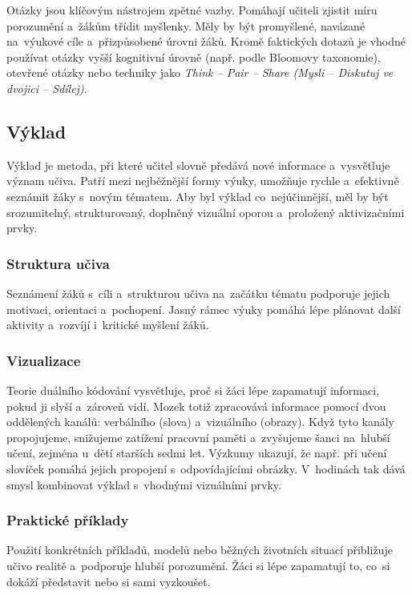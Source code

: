 \documentclass[male,czech,api_bc]{kitheses}
\begin{document}
Otázky jsou klíčovým nástrojem zpětné vazby. Pomáhají učiteli zjistit míru porozumění a~žákům třídit myšlenky. Měly by být promyšlené, navázané na~výukové cíle a~přizpůsobené úrovni žáků. Kromě faktických dotazů je vhodné používat otázky vyšší kognitivní úrovně (např. podle Bloomovy taxonomie), otevřené otázky nebo techniky jako \textit{Think -- Pair -- Share (Mysli -- Diskutuj ve dvojici -- Sdílej)}.

\subsection{Výklad}

Výklad je metoda, při které učitel slovně předává nové informace a~vysvětluje význam učiva. Patří mezi nejběžnější formy výuky, umožňuje rychle a~efektivně seznámit žáky s~novým tématem. Aby byl výklad co~nejúčinnější, měl by být srozumitelný, strukturovaný, doplněný vizuální oporou a~proložený aktivizačními prvky.

\subsubsection{Struktura učiva}

Seznámení žáků s~cíli a~strukturou učiva na~začátku tématu podporuje jejich motivaci, orientaci a~pochopení. Jasný rámec výuky pomáhá lépe plánovat další aktivity a~rozvíjí i~kritické myšlení žáků.

\subsubsection{Vizualizace}

Teorie duálního kódování vysvětluje, proč si žáci lépe zapamatují informaci, pokud ji slyší a~zároveň vidí. Mozek totiž zpracovává informace pomocí dvou oddělených kanálů: verbálního (slova) a~vizuálního (obrazy). Když tyto kanály propojujeme, snižujeme zatížení pracovní paměti a~zvyšujeme šanci na~hlubší učení, zejména u~dětí starších sedmi let. Výzkumy ukazují, že např. při učení slovíček pomáhá jejich propojení s~odpovídajícími obrázky. V~hodinách tak dává smysl kombinovat výklad s~vhodnými vizuálními prvky.

\subsubsection{Praktické příklady}

Použití konkrétních příkladů, modelů nebo běžných životních situací přibližuje učivo realitě a~podporuje hlubší porozumění. Žáci si lépe zapamatují to, co~si dokáží představit nebo si sami vyzkoušet.
\end{document}
